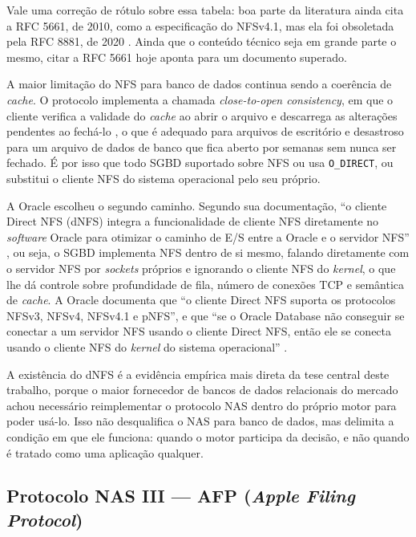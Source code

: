 \documentclass[11pt,a4paper]{article}
\begin{document}
Vale uma correção de rótulo sobre essa tabela: boa parte da literatura ainda cita a RFC 5661, de
2010, como a especificação do NFSv4.1, mas ela foi obsoletada pela RFC 8881, de 2020
\cite{rfc8881}. Ainda que o conteúdo técnico seja em grande parte o mesmo, citar a RFC 5661 hoje
aponta para um documento superado.

A maior limitação do NFS para banco de dados continua sendo a coerência de \textit{cache}. O
protocolo implementa a chamada \textit{close-to-open consistency}, em que o cliente verifica a
validade do \textit{cache} ao abrir o arquivo e descarrega as alterações pendentes ao fechá-lo
\cite{nfsman}, o que é adequado para arquivos de escritório e desastroso para um arquivo de dados de
banco que fica aberto por semanas sem nunca ser fechado. É por isso que todo SGBD suportado sobre NFS
ou usa \texttt{O\_DIRECT}, ou substitui o cliente NFS do sistema operacional pelo seu próprio.

\label{sec:dnfs}
A Oracle escolheu o segundo caminho. Segundo sua documentação, ``o cliente Direct NFS (dNFS) integra
a funcionalidade de cliente NFS diretamente no \textit{software} Oracle para otimizar o caminho de
E/S entre a Oracle e o servidor NFS'' \cite{oracledn}, ou seja, o SGBD implementa NFS dentro de si
mesmo, falando diretamente com o servidor NFS por \textit{sockets} próprios e ignorando o cliente
NFS do \textit{kernel}, o que lhe dá controle sobre profundidade de fila, número de conexões TCP e
semântica de \textit{cache}. A Oracle documenta que ``o cliente Direct NFS suporta os protocolos
NFSv3, NFSv4, NFSv4.1 e pNFS'', e que ``se o Oracle Database não conseguir se conectar a um servidor
NFS usando o cliente Direct NFS, então ele se conecta usando o cliente NFS do \textit{kernel} do
sistema operacional'' \cite{oracledn}.

A existência do dNFS é a evidência empírica mais direta da tese central deste trabalho, porque o
maior fornecedor de bancos de dados relacionais do mercado achou necessário reimplementar o protocolo
NAS dentro do próprio motor para poder usá-lo. Isso não desqualifica o NAS para banco de dados, mas
delimita a condição em que ele funciona: quando o motor participa da decisão, e não quando é tratado
como uma aplicação qualquer.

\subsection{Protocolo NAS III --- AFP (\textit{Apple Filing Protocol})}
\label{sec:afp}
\end{document}
